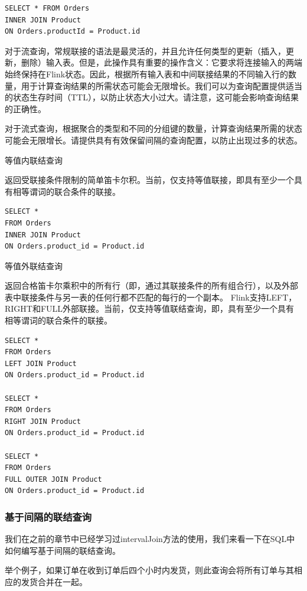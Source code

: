\documentclass[cn,11pt,chinese]{elegantbook}
\begin{document}
\begin{verbatim}
SELECT * FROM Orders
INNER JOIN Product
ON Orders.productId = Product.id
\end{verbatim}

对于流查询，常规联接的语法是最灵活的，并且允许任何类型的更新（插入，更新，删除）输入表。但是，此操作具有重要的操作含义：它要求将连接输入的两端始终保持在Flink状态。因此，根据所有输入表和中间联接结果的不同输入行的数量，用于计算查询结果的所需状态可能会无限增长。我们可以为查询配置提供适当的状态生存时间（TTL），以防止状态大小过大。请注意，这可能会影响查询结果的正确性。

对于流式查询，根据聚合的类型和不同的分组键的数量，计算查询结果所需的状态可能会无限增长。请提供具有有效保留间隔的查询配置，以防止出现过多的状态。

等值内联结查询

返回受联接条件限制的简单笛卡尔积。当前，仅支持等值联接，即具有至少一个具有相等谓词的联合条件的联接。

\begin{verbatim}
SELECT *
FROM Orders
INNER JOIN Product
ON Orders.product_id = Product.id
\end{verbatim}

等值外联结查询

返回合格笛卡尔乘积中的所有行（即，通过其联接条件的所有组合行），以及外部表中联接条件与另一表的任何行都不匹配的每行的一个副本。 Flink支持LEFT，RIGHT和FULL外部联接。当前，仅支持等值联结查询，即，具有至少一个具有相等谓词的联合条件的联接。

\begin{verbatim}
SELECT *
FROM Orders
LEFT JOIN Product
ON Orders.product_id = Product.id

SELECT *
FROM Orders
RIGHT JOIN Product
ON Orders.product_id = Product.id

SELECT *
FROM Orders
FULL OUTER JOIN Product
ON Orders.product_id = Product.id
\end{verbatim}

\subsubsection{基于间隔的联结查询}

我们在之前的章节中已经学习过intervalJoin方法的使用，我们来看一下在SQL中如何编写基于间隔的联结查询。

举个例子，如果订单在收到订单后四个小时内发货，则此查询会将所有订单与其相应的发货合并在一起。
\end{document}
